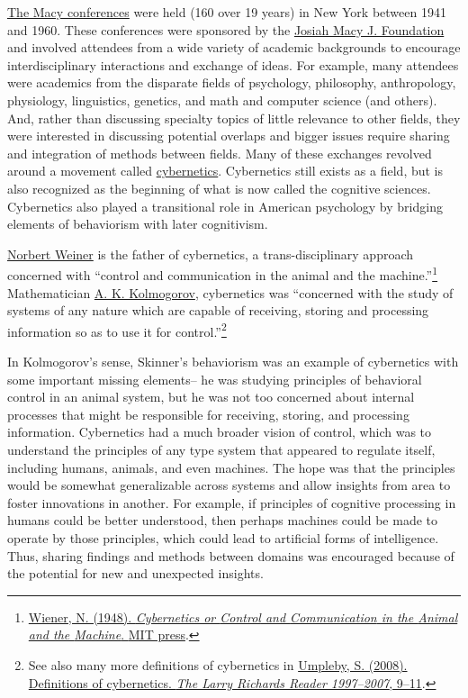 \documentclass[
  oneside,
  12pt]{crumpbook}
\begin{document}
\href{https://en.wikipedia.org/wiki/Macy_conferences}{The Macy conferences} were held (160 over 19 years) in New York between 1941 and 1960. These conferences were sponsored by the \href{https://en.wikipedia.org/wiki/Josiah_Macy_Jr._Foundation}{Josiah Macy J. Foundation} and involved attendees from a wide variety of academic backgrounds to encourage interdisciplinary interactions and exchange of ideas. For example, many attendees were academics from the disparate fields of psychology, philosophy, anthropology, physiology, linguistics, genetics, and math and computer science (and others). And, rather than discussing specialty topics of little relevance to other fields, they were interested in discussing potential overlaps and bigger issues require sharing and integration of methods between fields.
Many of these exchanges revolved around a movement called \href{https://en.wikipedia.org/wiki/Cybernetics}{cybernetics}. Cybernetics still exists as a field, but is also recognized as the beginning of what is now called the cognitive sciences. Cybernetics also played a transitional role in American psychology by bridging elements of behaviorism with later cognitivism.

\href{https://en.wikipedia.org/wiki/Norbert_Wiener}{Norbert Weiner} is the father of cybernetics, a trans-disciplinary approach concerned with ``control and communication in the animal and the machine.''\footnote{\protect\hyperlink{ref-wienerCyberneticsControlCommunication1948}{Wiener, N. (1948). \emph{Cybernetics or {Control} and {Communication} in the {Animal} and the {Machine}}. {MIT press}}.} Mathematician \href{https://en.wikipedia.org/wiki/Andrey_Kolmogorov}{A. K. Kolmogorov}, cybernetics was ``concerned with the study of systems of any nature which are capable of receiving, storing and processing information so as to use it for control.''\footnote{See also many more definitions of cybernetics in \protect\hyperlink{ref-umplebyDefinitionsCybernetics2008}{Umpleby, S. (2008). Definitions of cybernetics. \emph{The Larry Richards Reader 1997--2007}, 9--11}.}

In Kolmogorov's sense, Skinner's behaviorism was an example of cybernetics with some important missing elements-- he was studying principles of behavioral control in an animal system, but he was not too concerned about internal processes that might be responsible for receiving, storing, and processing information. Cybernetics had a much broader vision of control, which was to understand the principles of any type system that appeared to regulate itself, including humans, animals, and even machines. The hope was that the principles would be somewhat generalizable across systems and allow insights from area to foster innovations in another. For example, if principles of cognitive processing in humans could be better understood, then perhaps machines could be made to operate by those principles, which could lead to artificial forms of intelligence. Thus, sharing findings and methods between domains was encouraged because of the potential for new and unexpected insights.
\end{document}
